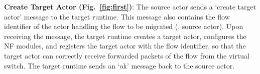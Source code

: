 


\textbf{Create Target Actor (Fig.~\ref{fig:first})}: The source actor %
sends a `create target actor' message to the target runtime. This message also contains the flow identifier of the actor handling the flow to be migrated (\ie, source actor). Upon receiving the message, the target runtime creates a target actor, configures the NF modules, and registers the target actor with the flow identifier, so that the target actor can correctly receive forwarded packets of the flow from the virtual switch. The target runtime sends an `ok' message back to the source actor.

